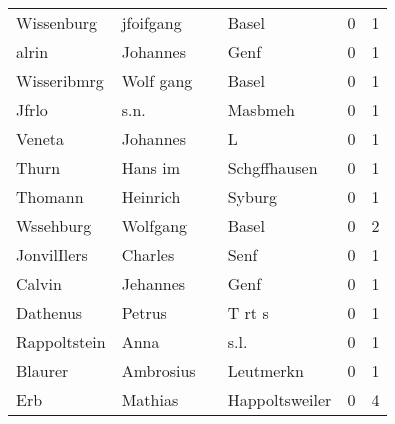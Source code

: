 \begin{tabular}{llllrr}
               Wissenburg &                          jfoifgang &             &                                       Basel &          0 &         1 \\
                    alrin &                           Johannes &             &                                        Genf &          0 &         1 \\
              Wisseribmrg &                          Wolf gang &             &                                       Basel &          0 &         1 \\
                    Jfrlo &                               s.n. &             &                                     Masbmeh &          0 &         1 \\
                   Veneta &                           Johannes &             &                                           L &          0 &         1 \\
                    Thurn &                            Hans im &             &                                Schgffhausen &          0 &         1 \\
                  Thomann &                           Heinrich &             &                                      Syburg &          0 &         1 \\
                Wssehburg &                           Wolfgang &             &                                       Basel &          0 &         2 \\
              JonvilIlers &                            Charles &             &                                        Senf &          0 &         1 \\
                   Calvin &                           Jehannes &             &                                        Genf &          0 &         1 \\
                 Dathenus &                             Petrus &             &                                      T rt s &          0 &         1 \\
             Rappoltstein &                               Anna &             &                                        s.l. &          0 &         1 \\
                  Blaurer &                          Ambrosius &             &                                   Leutmerkn &          0 &         1 \\
                      Erb &                            Mathias &             &                              Happoltsweiler &          0 &         4 \\

\end{tabular}
